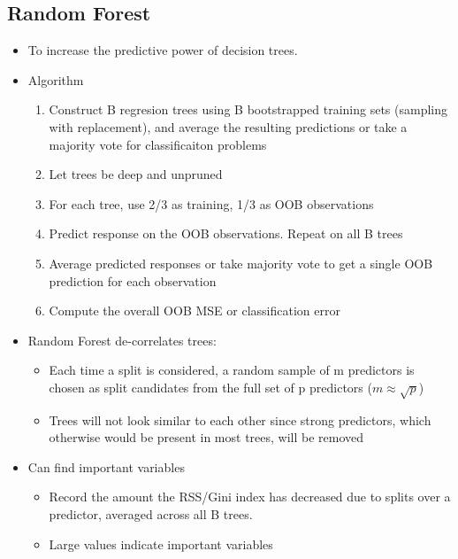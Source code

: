\documentclass{article}
\begin{document}
\begin{multicols*}{3}
        \section{Random Forest}
    \renewcommand\labelitemi{{\boldmath$\cdot$}}
    \begin{itemize}[noitemsep]
        \item To increase the predictive power of decision trees.
        \item Algorithm 
        \begin{enumerate}
            \item Construct B regresion trees using B bootstrapped training 
            sets (sampling with replacement), and average the resulting 
            predictions or take a majority vote for classificaiton problems
            \item Let trees be deep and unpruned
            \item For each tree, use 2/3 as training, 1/3 as OOB observations
            \item Predict response on the OOB observations. Repeat on all B trees
            \item Average predicted responses or take majority vote to get 
            a single OOB prediction for each observation
            \item Compute the overall OOB MSE or classification error
        \end{enumerate}
        \item Random Forest de-correlates trees:
        \begin{itemize}
            \item Each time a split is considered, a random sample of m 
            predictors is chosen as split candidates from the full set of 
            p predictors ($m \approx \sqrt{p}$)
            \item Trees will not look similar to each other since 
            strong predictors, which otherwise would be present in most trees, 
            will be removed
        \end{itemize}
        \item Can find important variables
        \begin{itemize}
            \item Record the amount the RSS/Gini index has decreased
            due to splits over a predictor, averaged across all B trees.
            \item Large values indicate important variables
        \end{itemize}
    \end{itemize}



\end{multicols*}
\end{document}

